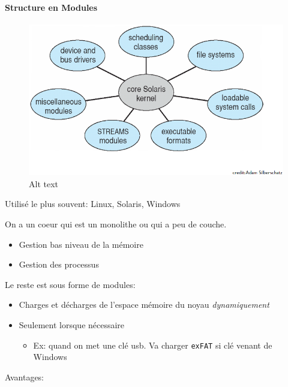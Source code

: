 \paragraph{Structure en Modules}\label{structure-en-modules}

\begin{figure}
\centering
\includegraphics{image-20.png}
\caption{Alt text}
\end{figure}

Utilisé le plus souvent: Linux, Solaris, Windows

On a un coeur qui est un monolithe ou qui a peu de couche.

\begin{itemize}
\tightlist
\item
  Gestion bas niveau de la mémoire
\item
  Gestion des processus
\end{itemize}

Le reste est sous forme de modules:

\begin{itemize}
\tightlist
\item
  Charges et décharges de l'espace mémoire du noyau \emph{dynamiquement}
\item
  Seulement lorsque nécessaire

  \begin{itemize}
  \tightlist
  \item
    Ex: quand on met une clé usb. Va charger \texttt{exFAT} si clé
    venant de Windows
  \end{itemize}
\end{itemize}

Avantages:

